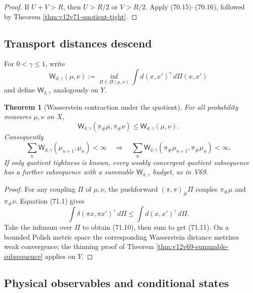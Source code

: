 \documentclass[11pt]{article}
\newtheorem{theorem}{Theorem}[section]
\theoremstyle{remark}
\begin{document}
\begin{proof}
If \(U+V>R\), then \(U>R/2\) or \(V>R/2\).  Apply
(70.15)--(70.16), followed by Theorem
\ref{thm:v12v71-quotient-tight}.
\end{proof}

\subsection{Transport distances descend}

For \(0<\gamma\leq1\), write
\[
 {\mathsf W}_{d,\gamma}(\mu,\nu)
 :=\inf_{\Pi\in\Pi(\mu,\nu)}
   \int d(x,x')^\gamma\,d\Pi(x,x')
\]
and define \({\mathsf W}_{\delta,\gamma}\) analogously on \(Y\).

\begin{theorem}[Wasserstein contraction under the quotient]
\label{thm:v12v71-Wasserstein}
For all probability measures \(\mu,\nu\) on \(X\),
\begin{equation}
 {\mathsf W}_{\delta,\gamma}(\pi_\#\mu,\pi_\#\nu)
 \leq{\mathsf W}_{d,\gamma}(\mu,\nu).                        \tag{71.10}
\end{equation}
Consequently
\begin{equation}
 \sum_n{\mathsf W}_{d,\gamma}(\mu_{n+1},\mu_n)<\infty
 \quad\Longrightarrow\quad
 \sum_n{\mathsf W}_{\delta,\gamma}
     (\pi_\#\mu_{n+1},\pi_\#\mu_n)<\infty.                   \tag{71.11}
\end{equation}
If only quotient tightness is known, every weakly convergent quotient
subsequence has a further subsequence with a summable
\({\mathsf W}_{\delta,\gamma}\) budget, as in V69.
\end{theorem}

\begin{proof}
For any coupling \(\Pi\) of \(\mu,\nu\), the pushforward
\((\pi,\pi)_\#\Pi\) couples \(\pi_\#\mu\) and \(\pi_\#\nu\).
Equation (71.1) gives
\[
 \int\delta(\pi x,\pi x')^\gamma\,d\Pi
 \leq\int d(x,x')^\gamma\,d\Pi.
\]
Take the infimum over \(\Pi\) to obtain (71.10), then sum to get
(71.11).  On a bounded Polish metric space the corresponding
Wasserstein distance metrizes weak convergence; the thinning proof
of Theorem \ref{thm:v12v69-summable-subsequence} applies on \(Y\).
\end{proof}

\subsection{Physical observables and conditional states}
\end{document}
